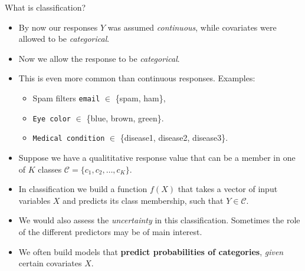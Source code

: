 \documentclass[10pt,ignorenonframetext,]{beamer}
\providecommand{\tightlist}{%
  \setlength{\itemsep}{0pt}\setlength{\parskip}{0pt}}
\begin{document}
\begin{frame}[fragile]{What is classification?}

\vspace{2mm}

\begin{itemize}
\item
  By now our responses \(Y\) was assumed \emph{continuous}, while
  covariates were allowed to be \emph{categorical}.
\item
  Now we allow the response to be \emph{categorical}.
\item
  This is even more common than continuous responses. Examples:

  \begin{itemize}
  \tightlist
  \item
    Spam filters \texttt{email} \(\in\) \{spam, ham\},
  \item
    \texttt{Eye\ color} \(\in\) \{blue, brown, green\}.
  \item
    \texttt{Medical\ condition} \(\in\) \{disease1, disease2,
    disease3\}.
  \end{itemize}
\end{itemize}

\end{frame}

\begin{frame}

\begin{itemize}
\item
  Suppose we have a qualititative response value that can be a member in
  one of \(K\) classes \(\mathcal{C} = \{c_1, c_2, \ldots , c_K\}\).
\item
  In classification we build a function \(f(X)\) that takes a vector of
  input variables \(X\) and predicts its class membership, such that
  \(Y \in \mathcal{C}\).
\item
  We would also assess the \emph{uncertainty} in this classification.
  Sometimes the role of the different predictors may be of main
  interest.
\item
  We often build models that \textbf{predict probabilities of
  categories}, \emph{given} certain covariates \(X\).
\end{itemize}

\end{frame}
\end{document}
